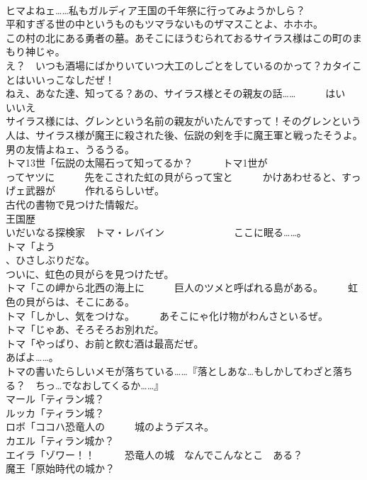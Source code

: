 \documentclass[8pt]{extreport}
\begin{document}
\begin{CJK}{UTF8}{min}
\\	ヒマよねェ……私もガルディア王国の千年祭に行ってみようかしら？	
\\	平和すぎる世の中というものもツマラないものザマスことよ、ホホホ。	
\\	この村の北にある勇者の墓。あそこにほうむられておるサイラス様はこの町のまもり神じゃ。	
\\	え？　いつも酒場にばかりいていつ大工のしごとをしているのかって？カタイことはいいっこなしだぜ！	
\\	ねえ、あなた達、知ってる？あの、サイラス様とその親友の話……　　　はい　　　いいえ	
\\	サイラス様には、グレンという名前の親友がいたんですって！そのグレンという人は、サイラス様が魔王に殺された後、伝説の剣を手に魔王軍と戦ったそうよ。	
\\	男の友情よねェ、うるうる。	
\\	トマ13世「伝説の太陽石って知ってるか？　　　トマ1世が
\\	ってヤツに　　　先をこされた虹の貝がらって宝と　　　かけあわせると、すっげェ武器が　　　作れるらしいぜ。	
\\	古代の書物で見つけた情報だ。	
\\	王国歴　
\\	いだいなる探検家　トマ・レバイン　　　　　　　ここに眠る……。	
\\	トマ「よう
\\	、ひさしぶりだな。	
\\	ついに、虹色の貝がらを見つけたぜ。	
\\	トマ「この岬から北西の海上に　　　巨人のツメと呼ばれる島がある。　　　虹色の貝がらは、そこにある。	
\\	トマ「しかし、気をつけな。　　　あそこにゃ化け物がわんさといるぜ。	
\\	トマ「じゃあ、そろそろお別れだ。	
\\	トマ「やっぱり、お前と飮む酒は最高だぜ。	
\\	あばよ……。	
\\	トマの書いたらしいメモが落ちている……『落としあな…もしかしてわざと落ちる？　ちっ…でなおしてくるか……』	
\\	マール「ティラン城？	
\\	ルッカ「ティラン城？	
\\	ロボ「ココハ恐竜人の　　　城のようデスネ。	
\\	カエル「ティラン城か？	
\\	エイラ「ゾワー！！　　　恐竜人の城　なんでこんなとこ　ある？	
\\	魔王「原始時代の城か？	

\end{CJK}
\end{document}

